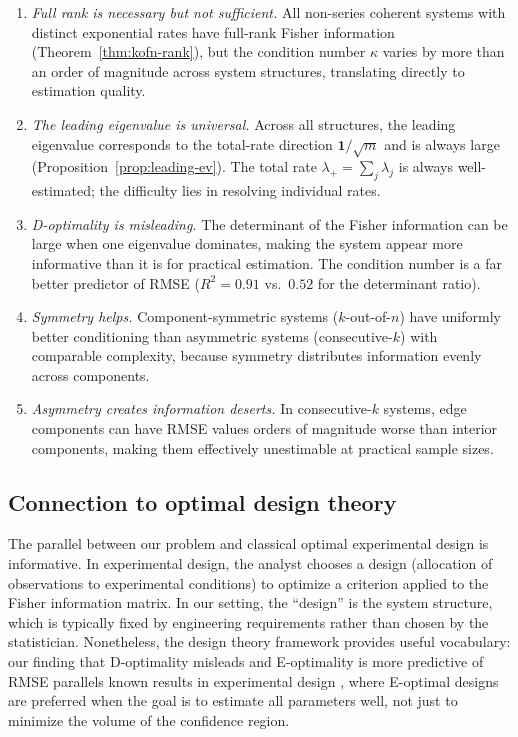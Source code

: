 \documentclass[12pt]{article}
\theoremstyle{definition}
\theoremstyle{remark}
\newcommand{\bone}{\mathbf{1}}
\begin{document}
\begin{enumerate}[leftmargin=2em]
  \item \emph{Full rank is necessary but not sufficient.}  All
    non-series coherent systems with distinct exponential rates have
    full-rank Fisher information (Theorem~\ref{thm:kofn-rank}), but
    the condition number $\kappa$ varies by more than an order of
    magnitude across system structures, translating directly to
    estimation quality.

  \item \emph{The leading eigenvalue is universal.}  Across all
    structures, the leading eigenvalue corresponds to the total-rate
    direction $\bone/\sqrt{m}$ and is always large
    (Proposition~\ref{prop:leading-ev}).  The total rate
    $\lambda_+ = \sum_j \lambda_j$ is always well-estimated; the
    difficulty lies in resolving individual rates.

  \item \emph{D-optimality is misleading.}  The determinant of the
    Fisher information can be large when one eigenvalue dominates,
    making the system appear more informative than it is for practical
    estimation.  The condition number is a far better predictor of RMSE
    ($R^2 = 0.91$ vs.\ $0.52$ for the determinant ratio).

  \item \emph{Symmetry helps.}  Component-symmetric systems
    ($k$-out-of-$n$) have uniformly better conditioning than asymmetric
    systems (consecutive-$k$) with comparable complexity, because
    symmetry distributes information evenly across components.

  \item \emph{Asymmetry creates information deserts.}  In
    consecutive-$k$ systems, edge components can have RMSE values
    orders of magnitude worse than interior components, making them
    effectively unestimable at practical sample sizes.
\end{enumerate}

\subsection{Connection to optimal design theory}
\label{sec:design-connection}

The parallel between our problem and classical optimal experimental
design \citep{Pukelsheim2006} is informative.  In experimental design,
the analyst chooses a design (allocation of observations to
experimental conditions) to optimize a criterion applied to the
Fisher information matrix.  In our setting, the ``design'' is the
system structure, which is typically fixed by engineering requirements
rather than chosen by the statistician.  Nonetheless, the design
theory framework provides useful vocabulary: our finding that
D-optimality misleads and E-optimality is more predictive of RMSE
parallels known results in experimental design
\citep{Atkinson2007}, where E-optimal designs are preferred when the
goal is to estimate all parameters well, not just to minimize the
volume of the confidence region.
\end{document}
